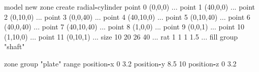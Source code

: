 \documentclass[a4paper, nobind]{templates/ociamthesis}
\newenvironment{Shaded}{\begin{snugshade}}{\end{snugshade}}
\newcommand{\BuiltInTok}[1]{#1}
\newcommand{\DecValTok}[1]{\textcolor[rgb]{0.00,0.00,0.81}{#1}}
\newcommand{\FloatTok}[1]{\textcolor[rgb]{0.00,0.00,0.81}{#1}}
\newcommand{\NormalTok}[1]{#1}
\newcommand{\OperatorTok}[1]{\textcolor[rgb]{0.81,0.36,0.00}{\textbf{#1}}}
\newcommand{\StringTok}[1]{\textcolor[rgb]{0.31,0.60,0.02}{#1}}
\renewenvironment{Shaded}
{
  \vspace{10pt}%
  \begin{snugshade}%
}{%
  \end{snugshade}%
  \vspace{8pt}%
}
\begin{document}
\begin{Shaded}
\begin{Highlighting}[]
\NormalTok{model new}
\NormalTok{zone create radial}\OperatorTok{{-}}\NormalTok{cylinder point }\DecValTok{0}\NormalTok{ (}\DecValTok{0}\NormalTok{,}\DecValTok{0}\NormalTok{,}\DecValTok{0}\NormalTok{) ...}
\NormalTok{                            point }\DecValTok{1}\NormalTok{ (}\DecValTok{40}\NormalTok{,}\DecValTok{0}\NormalTok{,}\DecValTok{0}\NormalTok{) ...}
\NormalTok{                            point }\DecValTok{2}\NormalTok{ (}\DecValTok{0}\NormalTok{,}\DecValTok{10}\NormalTok{,}\DecValTok{0}\NormalTok{) ...}
\NormalTok{                            point }\DecValTok{3}\NormalTok{ (}\DecValTok{0}\NormalTok{,}\DecValTok{0}\NormalTok{,}\DecValTok{40}\NormalTok{) ...}
\NormalTok{                            point }\DecValTok{4}\NormalTok{ (}\DecValTok{40}\NormalTok{,}\DecValTok{10}\NormalTok{,}\DecValTok{0}\NormalTok{) ...}
\NormalTok{                            point }\DecValTok{5}\NormalTok{ (}\DecValTok{0}\NormalTok{,}\DecValTok{10}\NormalTok{,}\DecValTok{40}\NormalTok{) ...}
\NormalTok{                            point }\DecValTok{6}\NormalTok{ (}\DecValTok{40}\NormalTok{,}\DecValTok{0}\NormalTok{,}\DecValTok{40}\NormalTok{) ...}
\NormalTok{                            point }\DecValTok{7}\NormalTok{ (}\DecValTok{40}\NormalTok{,}\DecValTok{10}\NormalTok{,}\DecValTok{40}\NormalTok{) ...}
\NormalTok{                            point }\DecValTok{8}\NormalTok{ (}\DecValTok{1}\NormalTok{,}\DecValTok{0}\NormalTok{,}\DecValTok{0}\NormalTok{) ...}
\NormalTok{                            point }\DecValTok{9}\NormalTok{ (}\DecValTok{0}\NormalTok{,}\DecValTok{0}\NormalTok{,}\DecValTok{1}\NormalTok{) ...}
\NormalTok{                            point }\DecValTok{10}\NormalTok{ (}\DecValTok{1}\NormalTok{,}\DecValTok{10}\NormalTok{,}\DecValTok{0}\NormalTok{) ...}
\NormalTok{                            point }\DecValTok{11}\NormalTok{ (}\DecValTok{0}\NormalTok{,}\DecValTok{10}\NormalTok{,}\DecValTok{1}\NormalTok{) ...}
\NormalTok{                            size }\DecValTok{10} \DecValTok{20} \DecValTok{26} \DecValTok{40}\NormalTok{ ...}
\NormalTok{                            rat }\DecValTok{1} \DecValTok{1} \DecValTok{1} \FloatTok{1.5}\NormalTok{ ...}
\NormalTok{                            fill group }\StringTok{"shaft"}

\NormalTok{zone group }\StringTok{"plate"} \BuiltInTok{range}\NormalTok{ position}\OperatorTok{{-}}\NormalTok{x }\DecValTok{0} \FloatTok{3.2}\NormalTok{ position}\OperatorTok{{-}}\NormalTok{y }\FloatTok{8.5} \DecValTok{10}\NormalTok{ position}\OperatorTok{{-}}\NormalTok{z }\DecValTok{0} \FloatTok{3.2}
\end{Highlighting}
\end{Shaded}
\end{document}
